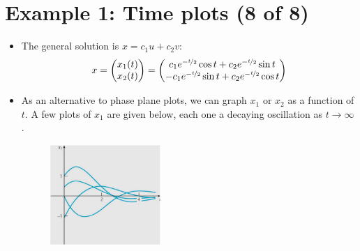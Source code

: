 \documentclass[11pt,a4paper]{article}
\begin{document}
	\section*{Example 1: Time plots (8 of 8)}
	\begin{itemize}
		\item The general solution is $x = c_1u + c_2v$:
		$$
		x =
		\begin{pmatrix}
			x_1(t)\\
			x_2(t)
		\end{pmatrix}=
		\begin{pmatrix}
			c_1e^{-\nicefrac{t}{2}}\cos t + c_2 e^{-\nicefrac{t}{2}}\sin t\\
			-c_1e^{-\nicefrac{t}{2}}\sin t + c_2 e^{-\nicefrac{t}{2}}\cos t
		\end{pmatrix}
		$$
		\item As an alternative to phase plane plots, we can graph $x_1$ or $x_2$ as a function of $t$. A few plots of $x_1$ are given below, each one a decaying oscillation as $t \to \infty$.
		\begin{figure}[H]
			\centering
				\includegraphics[width=0.40\textwidth]{figure/Lec13f3.PNG}
		\end{figure}
	\end{itemize}
\end{document}
